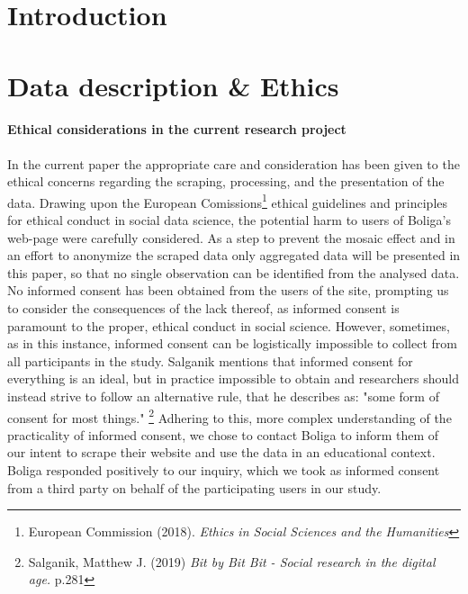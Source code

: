 \documentclass[12pt,a4paper]{article}
\begin{document}

\newpage
\onehalfspacing

\tableofcontents
\newpage
\section{Introduction}

\section{Data description \& Ethics}

\paragraph{Ethical considerations in the current research project\newline}
In the current paper the appropriate care and consideration has been given to the ethical concerns regarding the scraping, processing, and the presentation of the data. Drawing upon the European Comissions\footnote{European Commission (2018). \textit{Ethics in Social Sciences and the Humanities}} ethical guidelines and principles for ethical conduct in social data science, the potential harm to users of Boliga's web-page were carefully considered. As a step to prevent the mosaic effect and in an effort to anonymize the scraped data only aggregated data will be presented in this paper, so that no single observation can be identified from the analysed data.\newline
No informed consent has been obtained from the users of the site, prompting us to consider the consequences of the lack thereof, as informed consent is paramount to the proper, ethical conduct in social science. However, sometimes, as in this instance, informed consent can be logistically impossible to collect from all participants in the study. Salganik mentions that informed consent for everything is an ideal, but in practice impossible to obtain and researchers should instead strive to follow an alternative rule, that he describes as: "some form of consent for most things." \footnote{Salganik, Matthew J. (2019) \textit{Bit by Bit Bit - Social research in the digital age.} p.281} Adhering to this, more complex  understanding of the practicality of informed consent, we chose to contact Boliga to inform them of our intent to scrape their website and use the data in an educational context. Boliga responded positively to our inquiry, which we took as informed consent from a third party on behalf of the participating users in our study.\newline
\end{document}
